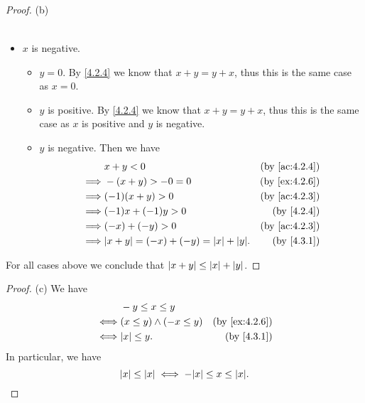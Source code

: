\begin{proof}{(b)}
\begin{itemize}
\begin{itemize}
\begin{itemize}
\begin{align*}
                          \end{align*}
                  \end{itemize}
          \end{itemize}
    \item \(x\) is negative.
          \begin{itemize}
            \item \(y = 0\).
                  By \cref{4.2.4} we know that \(x + y = y + x\), thus this is the same case as \(x = 0\).
            \item \(y\) is positive.
                  By \cref{4.2.4} we know that \(x + y = y + x\), thus this is the same case as \(x\) is positive and \(y\) is negative.
            \item \(y\) is negative.
                  Then we have
                  \begin{align*}
                             & x + y < 0                                      & \text{(by \cref{ac:4.2.4})} \\
                    \implies & -(x + y) > -0 = 0                              & \text{(by \cref{ex:4.2.6})} \\
                    \implies & (-1)(x + y) > 0                                & \text{(by \cref{ac:4.2.3})} \\
                    \implies & (-1)x + (-1)y > 0                              & \text{(by \cref{4.2.4})}    \\
                    \implies & (-x) + (-y) > 0                                & \text{(by \cref{ac:4.2.3})} \\
                    \implies & \abs{x + y} = (-x) + (-y) = \abs{x} + \abs{y}. & \text{(by \cref{4.3.1})}
                  \end{align*}
          \end{itemize}
  \end{itemize}
  For all cases above we conclude that \(\left\lvert x + y\right\rvert \leq \left\lvert x\right\rvert + \left\lvert y\right\rvert\).
\end{proof}

\begin{proof}{(c)}
  We have
  \begin{align*}
         & -y \leq x \leq y                                           \\
    \iff & (x \leq y) \land (-x \leq y) & \text{(by \cref{ex:4.2.6})} \\
    \iff & \abs{x} \leq y.              & \text{(by \cref{4.3.1})}
  \end{align*}
  In particular, we have
  \[
    \abs{x} \leq \abs{x} \iff -\abs{x} \leq x \leq \abs{x}.
  \]
\end{proof}

